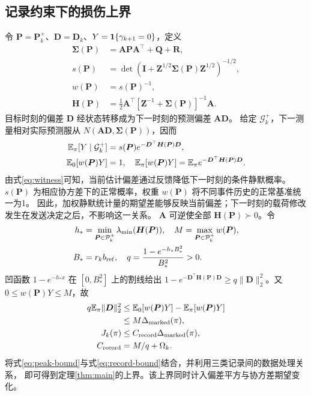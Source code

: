 \subsection{记录约束下的损伤上界}
令 ${\bm{P}}={\bm{P}}_k^+$、${\bm{D}}={\bm{D}}_k$、$Y=\mathbf 1\{\gamma_{k+1}=0\}$，定义
\begin{equation}
 \begin{aligned}
 {\bm{\Sigma}}({\bm{P}})&={\bm{A}}{\bm{P}}{\bm{A}}^\top+{\bm{Q}}+{\bm{R}},\\
 s({\bm{P}})&=\det({\bm{I}}+{\bm{Z}}^{1/2}{\bm{\Sigma}}({\bm{P}}){\bm{Z}}^{1/2})^{-1/2},\\
 w({\bm{P}})&=s({\bm{P}})^{-1},\\
 {\bm{H}}({\bm{P}})&=\tfrac12 {\bm{A}}^\top[{\bm{Z}}^{-1}+{\bm{\Sigma}}({\bm{P}})]^{-1}{\bm{A}}.
 \end{aligned}
 \label{eq:witness-functions}
\end{equation}
目标时刻的偏差 ${\bm{D}}$ 经状态转移成为下一时刻的预测偏差 ${\bm{A}}{\bm{D}}$。
给定 $\mathcal G_k^+$，下一测量相对实际预测服从 $N({\bm{A}}{\bm{D}},{\bm{\Sigma}}({\bm{P}}))$，因而
\begin{equation}
 \begin{aligned}
 \mathbb E_\pi[Y\mid\mathcal G_k^+]&=s({\bm{P}})e^{-{\bm{D}}^\top {\bm{H}}({\bm{P}}){\bm{D}}},\\
 \mathbb E_0[w({\bm{P}})Y]&=1,\quad
 \mathbb E_\pi[w({\bm{P}})Y]=\mathbb E_\pi e^{-{\bm{D}}^\top {\bm{H}}({\bm{P}}){\bm{D}}}.
 \end{aligned}
 \label{eq:witness}
\end{equation}
由式\eqref{eq:witness}可知，当前估计偏差通过反馈降低下一时刻的条件静默概率。
$s({\bm{P}})$ 为相应协方差下的正常概率，权重 $w({\bm{P}})$ 将不同事件历史的正常基准统一为1。
因此，加权静默统计量的期望差能够反映当前偏差；下一时刻的载荷修改发生在发送决定之后，不影响这一关系。
${\bm{A}}$ 可逆使全部 ${\bm{H}}({\bm{P}})\succ0$。令
\begin{equation}
 \begin{aligned}
 h_*&=\min_{{\bm{P}}\in\mathcal P_k^+}\lambda_{\min}({\bm{H}}({\bm{P}})),\quad
 M=\max_{{\bm{P}}\in\mathcal P_k^+}w({\bm{P}}),\\
 B_*&=r_kb_{\rm ref},\quad q=\frac{1-e^{-h_*B_*^2}}{B_*^2}>0.
 \end{aligned}
 \label{eq:witness-constants}
\end{equation}
凹函数 $1-e^{-h_*x}$ 在 $[0,B_*^2]$ 上的割线给出
$1-e^{-{\bm{D}}^\top {\bm{H}}({\bm{P}}){\bm{D}}}\ge q\|{\bm{D}}\|_2^2$。又 $0\le w({\bm{P}})Y\le M$，故
\begin{equation}
 \begin{aligned}
 q\mathbb E_\pi\|{\bm{D}}\|_2^2&\le\mathbb E_0[w({\bm{P}})Y]-\mathbb E_\pi[w({\bm{P}})Y]\\
 &\le M\Delta_{\rm marked}(\pi),\\
 J_k(\pi)&\le C_{\rm record}\Delta_{\rm marked}(\pi),\\
 C_{\rm record}&=M/q+\Omega_k.
 \end{aligned}
 \label{eq:record-bound}
\end{equation}
将式\eqref{eq:peak-bound}与式\eqref{eq:record-bound}结合，并利用三类记录间的数据处理关系，
即可得到定理\ref{thm:main}的上界。该上界同时计入偏差平方与协方差期望变化。

